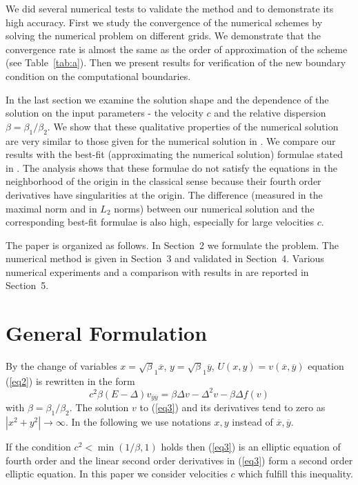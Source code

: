 \documentclass[preprint]{elsarticle}
\newcommand{\rf}[1]{(\ref{#1})}
\begin{document}
 We did several numerical  tests to validate the method and to demonstrate its high accuracy. First we study   
the convergence of the  numerical schemes by solving the numerical problem on different grids. We demonstrate that  the convergence rate  is almost the same as the order of approximation of the scheme (see  Table~\ref{tab:a}). Then we present results for verification of the new boundary condition on the computational boundaries. 
 
In the last section we examine the    solution shape and the dependence of the solution on the input  parameters - the velocity $c$ and the relative dispersion $\beta =\beta_1  / \beta_2$. We show that these  qualitative properties of the numerical solution are very similar to those given for the  numerical solution in \cite{Ch2011,Ch2012} . 
We compare our results with the best-fit  (approximating the numerical solution)  formulae stated in \cite{Ch2011}.   
The analysis   shows that  these formulae do not satisfy the equations in the neighborhood of the origin in the classical sense because their fourth order derivatives have singularities at the origin.  The  difference (measured in the maximal norm and in $L_2$ norms)  between our numerical solution and the corresponding best-fit formulae is also high, especially  for large velocities $c$. 

The paper is organized as follows. In Section~2 we formulate the  problem. The numerical method is given in Section~3 and validated in Section~4.  Various numerical  experiments and a comparison with  results in \cite{Ch2011,Ch2012} are reported in Section~5.

\section{General Formulation}

By the change of variables $x=\sqrt\beta_1 { \overline x}$, $y=\sqrt\beta_1 { \overline y}$, $U(x,y)= v({ \overline x},{ \overline y} )$ 
 equation \rf{eq2} is rewritten in the form 
 \begin{equation}\label{eq3}
c^2 \beta (E- \Delta) v_{{\overline y}{\overline y}} = \beta \Delta v - \Delta^2 v - \beta \Delta f(v)
\end{equation}
with   $\beta = \beta_1 / \beta_2$.
The solution $v$ to \rf{eq3} and its derivatives  tend to zero as $|x^2 +y^2|\rightarrow \infty$.
In the following we use notations $x,y$ instead of ${\overline x},{\overline y}$.

If the condition $c^2 < \min (1/ \beta,1)$ holds then  \rf{eq3} is an elliptic equation of fourth order and the linear second order derivatives in \rf{eq3} form  a second order elliptic equation. In this paper we consider velocities $c$ which fulfill this inequality.
\end{document}
